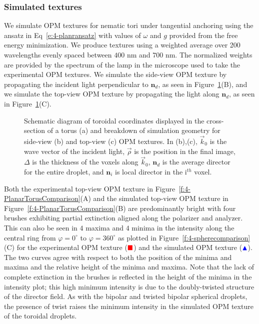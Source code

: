 \subsubsection{Simulated textures}
We simulate OPM textures for nematic tori under tangential anchoring using the ansatz in Eq~\ref{e:4-planransatz} with values of $\omega$ and $g$ provided from the free energy minimization.
We produce textures using a weighted average over 200 wavelengths evenly spaced between $400$ nm and $700$ nm.
The normalized weights are provided by the spectrum of the lamp in the microscope used to take the experimental OPM textures.
We simulate the side-view OPM texture by propagating the incident light perpendicular to $\mathbf{n}_d$, as seen in Figure~\ref{fig_tourscoords}(B), and we simulate the top-view OPM texture by propagating the light along $\mathbf{n}_d$, as seen in Figure~\ref{fig_tourscoords}(C).\\
\begin{figure}
\centering
\caption{Schematic diagram of toroidal coordinates displayed in the cross-section of a torus (a) and breakdown of simulation geometry for side-view (b) and top-view (c) OPM textures.
In (b),(c), $\vec{k}_0$ is the wave vector of the incident light, $\vec{\rho}$ is the position in the final image, $\Delta$ is the thickness of the voxels along $\vec{k}_0$, $\mathbf{n}_d$ is the average director for the entire droplet, and $\mathbf{n}_i$ is local director in the i$^{th}$ voxel.}\label{fig_tourscoords}
\end{figure}

Both the experimental top-view OPM texture in Figure~\ref{f:4-PlanarTorusComparison}(A) and the simulated top-view OPM texture in Figure~\ref{f:4-PlanarTorusComparison}(B) are predominantly bright with four brushes exhibiting partial extinction aligned along the polarizer and analyzer.
This can also be seen in $4$ maxima and $4$ minima in the intensity along the central ring from $\varphi=0^{\circ}$ to $\varphi=360^{\circ}$ as plotted in Figure~\ref{f:4-spherecomparison}(C) for the experimental OPM texture ($\color{red}\blacksquare$) and the simulated OPM texture ($\color{blue}\blacktriangle$).
The two curves agree with respect to both the position of the minima and maxima and the relative height of the minima and maxima.
Note that the lack of complete extinction in the brushes is reflected in the height of the minima in the intensity plot; this high minimum intensity is due to the doubly-twisted structure of the director field.
As with the bipolar and twisted bipolar spherical droplets, the presence of twist raises the minimum intensity in the simulated OPM texture of the toroidal droplets.

